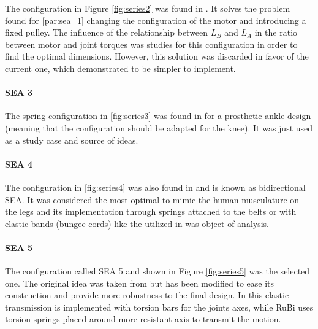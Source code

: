 The configuration in Figure \ref{fig:series2} was found in \cite{biobiped}.
It solves the problem found for \ref{par:sea_1} changing the configuration of the motor and introducing a fixed pulley.
The influence of the relationship between $L_{B}$ and $L_{A}$ in the ratio between motor and joint torques was studies for this configuration in order to find the optimal dimensions.
However, this solution was discarded in favor of the current one, which demonstrated to be simpler to implement.

\paragraph{SEA 3} %
\label{par:sea_3}
The spring configuration in \ref{fig:series3} was found in \cite{grimmer} for a prosthetic ankle design (meaning that the configuration should be adapted for the knee).
It was just used as a study case and source of ideas. 

\paragraph{SEA 4} %
\label{par:sea_4}
The configuration in \ref{fig:series4} was also found in \cite{biobiped} and is known as bidirectional SEA.
It was considered the most optimal to mimic the human musculature on the legs and its implementation through springs attached to the belts or with elastic bands (bungee cords) like the utilized in \cite{imperial_college} was object of analysis.

\paragraph{SEA 5} %
\label{par:sea_5}
The configuration called SEA 5 and shown in Figure \ref{fig:series5} was the selected one.
The original idea was taken from \cite{phides} but has been modified to ease its construction and provide more robustness to the final design.
In \cite{phides} this elastic transmission is implemented with torsion bars for the joints axes, while RuBi uses torsion springs placed around more resistant axis to transmit the motion.

